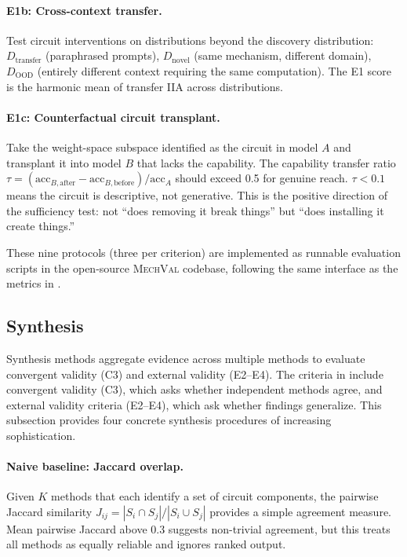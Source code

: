 \documentclass{article}
\newcommand{\mechval}{\textsc{MechVal}}
\begin{document}
\paragraph{E1b: Cross-context transfer.} Test circuit interventions on distributions beyond the discovery distribution: $D_{\text{transfer}}$ (paraphrased prompts), $D_{\text{novel}}$ (same mechanism, different domain), $D_{\text{OOD}}$ (entirely different context requiring the same computation). The E1 score is the harmonic mean of transfer IIA across distributions.

\paragraph{E1c: Counterfactual circuit transplant.} Take the weight-space subspace identified as the circuit in model $A$ and transplant it into model $B$ that lacks the capability. The capability transfer ratio $\tau = (\text{acc}_{B,\text{after}} - \text{acc}_{B,\text{before}}) / \text{acc}_A$ should exceed 0.5 for genuine reach. $\tau < 0.1$ means the circuit is descriptive, not generative. This is the positive direction of the sufficiency test: not ``does removing it break things'' but ``does installing it create things.''

These nine protocols (three per criterion) are implemented as runnable evaluation scripts in the open-source \mechval{} codebase, following the same interface as the metrics in .

\subsection{Synthesis}
\label{sec:methodology-synthesis}

Synthesis methods aggregate evidence across multiple methods to evaluate convergent validity (C3) and external validity (E2--E4). The criteria in  include convergent validity (C3), which asks whether independent methods agree, and external validity criteria (E2--E4), which ask whether findings generalize. This subsection provides four concrete synthesis procedures of increasing sophistication.

\paragraph{Naive baseline: Jaccard overlap.} Given $K$ methods that each identify a set of circuit components, the pairwise Jaccard similarity $J_{ij} = |S_i \cap S_j| / |S_i \cup S_j|$ provides a simple agreement measure. Mean pairwise Jaccard above 0.3 suggests non-trivial agreement, but this treats all methods as equally reliable and ignores ranked output.
\end{document}
